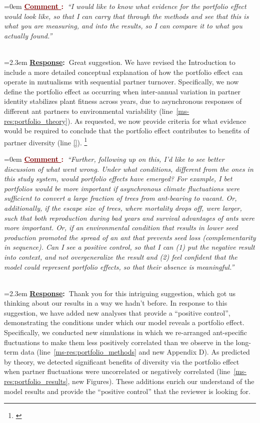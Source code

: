 \documentclass[12pt]{article}
\newcounter{cN}
\newcommand{\comment}[1]{
	\vspace{2em}
	\refstepcounter{cN} %
	\noindent \hangindent=0em \textbf{\textcolor{Maroon}{\uline{Comment \thecN}:~}}\emph{``#1''}
	}
\newcommand{\response}[1]{
	\\[0.25em]
	\hangindent=2.3em \textbf{\textcolor{NavyBlue}{\uline{Response}:~}}#1
	}
\newcommand{\tom}[2]{{\color{red}{#1}}\footnote{\textit{\color{red}{#2}}}}
\begin{document}
\comment{I would like to know what evidence for the portfolio effect would look like, so that I can carry that through the methods and see that this is what you are measuring, and into the results, so I can compare it to what you actually found.}
\response{Great suggestion. 
	We have revised the Introduction to include a more detailed conceptual explanation of how the portfolio effect can operate in mutualisms with sequential partner turnover. 
	Specifically, we now define the portfolio effect as occurring when inter-annual variation in partner identity stabilizes plant fitness across years, due to asynchronous responses of different ant partners to environmental variability (line~\ref{ms-res:portfolio_theory}).
	As requested, we now provide criteria for what evidence would be required to conclude that the portfolio effect contributes to benefits of partner diversity (line \ref{}).
	\tom{}{I think there is more work to do to address this comment.}}

\comment{Further, following up on this, I'd like to see better discussion of what went wrong. 
Under what conditions, different from the ones in this study system, would portfolio effects have emerged? 
For example, I bet portfolios would be more important if asynchronous climate fluctuations were sufficient to convert a large fraction of trees from ant-bearing to vacant. 
Or, additionally, if the escape size of trees, where mortality drops off, were larger, such that both reproduction during bad years and survival advantages of ants were more important.  
Or, if an environmental condition that results in lower seed production promoted the spread of an ant that prevents seed loss (complementarity in sequence).
Can I see a positive control, so that I can (1) put the negative result into context, and not overgeneralize the result and (2) feel confident that the model could represent portfolio effects, so that their absence is meaningful.}
\response{Thank you for this intriguing suggestion, which got us thinking about our results in a way we hadn't before. 
In response to this suggestion, we have added new analyses that provide a ``positive control'', demonstrating the conditions under which our model reveals a portfolio effect.
Specifically, we conducted new simulations in which we re-arranged ant-specific fluctuations to make them less positively correlated than we observe in the long-term data (line~\ref{ms-res:portfolio_methods} and new Appendix D).
As predicted by theory, we detected significant benefits of diversity via the portfolio effect when partner fluctuations were uncorrelated or negatively correlated (line~\ref{ms-res:portfolio_results}, new Figures). 
These additions enrich our understand of the model results and provide the ``positive control'' that the reviewer is looking for.}
\end{document}

